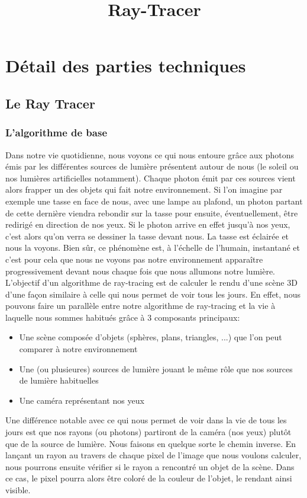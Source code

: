 \documentclass[11pt]{article}
\author{}
\title{Ray-Tracer}
\date{}
\begin{document}
\maketitle

\section{Détail des parties techniques}
\subsection{Le Ray Tracer}
\subsubsection{L'algorithme de base}
Dans notre vie quotidienne, nous voyons ce qui nous entoure grâce aux photons émis par les différentes sources de lumière présentent autour de nous (le soleil ou nos lumières artificielles notamment). Chaque photon émit par ces sources vient alors frapper un des objets qui fait notre environnement. Si l'on imagine par exemple une tasse en face de nous, avec une lampe au plafond, un photon partant de cette dernière viendra rebondir sur la tasse pour ensuite, éventuellement, être redirigé en direction de nos yeux. Si le photon arrive en effet jusqu'à nos yeux, c'est alors qu'on verra se dessiner la tasse devant nous. La tasse est éclairée et nous la voyons. Bien sûr, ce phénomène est, à l'échelle de l'humain, instantané et c'est pour cela que nous ne voyons pas notre environnement apparaître progressivement devant nous chaque fois que nous allumons notre lumière. \\
L'objectif d'un algorithme de ray-tracing est de calculer le rendu d'une scène 3D d'une façon similaire à celle qui nous permet de voir tous les jours. En effet, nous pouvons faire un parallèle entre notre algorithme de ray-tracing et la vie à laquelle nous sommes habitués grâce à 3 composants principaux:
\begin{itemize}
	\item{Une scène composée d'objets (sphères, plans, triangles, ...) que l'on peut comparer à notre environnement}
	\item{Une (ou plusieures) sources de lumière jouant le même rôle que nos sources de lumière habituelles}
	\item{Une caméra représentant nos yeux}
\end{itemize}
Une différence notable avec ce qui nous permet de voir dans la vie de tous les jours est que nos rayons (ou photons) partiront de la caméra (nos yeux) plutôt que de la source de lumière. Nous faisons en quelque sorte le chemin inverse. En lançant un rayon au travers de chaque pixel de l'image que nous voulons calculer, nous pourrons ensuite vérifier si le rayon a rencontré un objet de la scène. Dans ce cas, le pixel pourra alors être coloré de la couleur de l'objet, le rendant ainsi visible.
\end{document}
